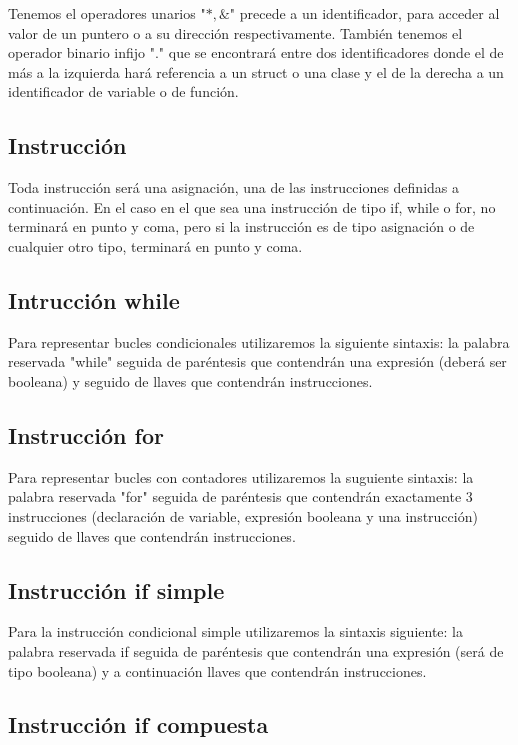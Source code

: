 \documentclass{article}
\begin{document}
Tenemos el operadores unarios "$*,\&$" precede a un identificador, para acceder al valor de un puntero o a su dirección respectivamente.
También tenemos el operador binario infijo "." que se encontrará entre dos identificadores donde el de más a la izquierda hará referencia a un struct o una clase y el de la derecha a un identificador de variable o de función.


\subsection{Instrucción}
Toda instrucción será una asignación, una de las instrucciones definidas a continuación. En el caso en el que sea una instrucción de tipo if, while o for, no terminará en punto y coma, pero si la instrucción es de tipo asignación o de cualquier otro tipo, terminará en punto y coma.


\subsection{Intrucción while}

Para representar bucles condicionales utilizaremos la siguiente sintaxis: la palabra reservada "while" seguida de paréntesis que contendrán una expresión (deberá ser booleana) y seguido de llaves que contendrán instrucciones.

\subsection{Instrucción for}

Para representar bucles con contadores utilizaremos la suguiente sintaxis: la palabra reservada "for" seguida de paréntesis que contendrán exactamente 3 instrucciones (declaración de variable, expresión booleana y una instrucción) seguido de llaves que contendrán instrucciones.

\subsection{Instrucción if simple}

Para la instrucción condicional simple utilizaremos la sintaxis siguiente: la palabra reservada if seguida de paréntesis que contendrán una expresión (será de tipo booleana) y a continuación llaves que contendrán instrucciones.

\subsection{Instrucción if compuesta}
\end{document}

